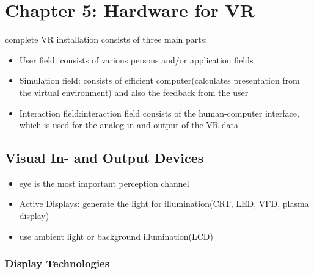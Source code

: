 \documentclass{standalone}
\begin{document}
\setcounter{section}{4}
\section{Chapter 5: Hardware for VR}
complete VR installation consists of three main parts:
\begin{itemize}
\item User field: consists of various persons and/or application fields
\item Simulation field: consists of efficient computer(calculates presentation from the virtual environment) and also the feedback from the user
\item Interaction field:interaction field consists of the human-computer interface, which is used for the analog-in and output of the VR data 
\end{itemize}

\subsection{Visual In- and Output Devices}
\begin{itemize}
\item eye is the most important perception channel
\item Active Displays: generate the light for illumination(CRT, LED, VFD, plasma display)
\item use ambient light or background illumination(LCD)
\end{itemize}

\subsubsection{Display Technologies}
\end{document}
